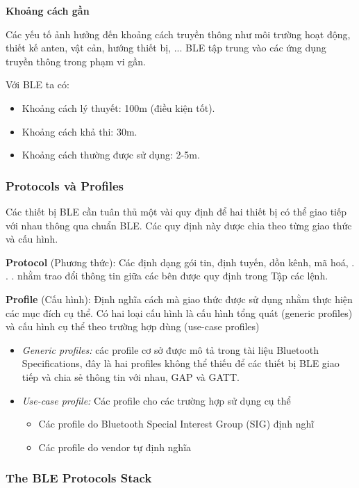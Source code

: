 \textbf{Khoảng cách gần}

Các yếu tố ảnh hưởng đến khoảng cách truyền thông như môi trường hoạt động, thiết kế anten, vật cản, hướng thiết bị, ... BLE tập trung vào các ứng dụng truyền thông trong phạm vi gần.

Với BLE ta có:
\begin{itemize}
    \item Khoảng cách lý thuyết: 100m (điều kiện tốt).
    \item Khoảng cách khả thi: 30m.
    \item Khoảng cách thường được sử dụng: 2-5m.
\end{itemize}

\subsubsection{Protocols và Profiles}

Các thiết bị BLE cần tuân thủ một vài quy định để hai thiết bị có thể giao tiếp với nhau thông qua chuẩn BLE. Các quy định này được chia theo từng giao thức và cấu hình.

\textbf{Protocol} (Phương thức): Các định dạng gói tin, định tuyến, dồn kênh, mã hoá, . . . nhằm trao đổi thông tin giữa các bên được quy định trong Tập các lệnh.

\textbf{Profile} (Cấu hình): Định nghĩa cách mà giao thức được sử dụng nhằm thực hiện các mục đích cụ thể. Có hai loại cấu hình là cấu hình tổng quát (generic profiles) và cấu hình cụ thể theo trường hợp dùng (use-case profiles)


\begin{itemize}
    \item \textit{Generic profiles:} các profile cơ sở được mô tả trong tài liệu Bluetooth Specifications, đây là hai profiles không thể thiếu để các thiết bị BLE giao tiếp và chia sẻ thông tin với nhau, GAP và GATT.
    \item \textit{Use-case profile:} Các profile cho các trường hợp sử dụng cụ thể
    \begin{itemize}
        \item Các profile do Bluetooth Special Interest Group (SIG) định nghĩ
        \item Các profile do vendor tự định nghĩa
    \end{itemize}
\end{itemize}

\subsubsection{The BLE Protocols Stack}


